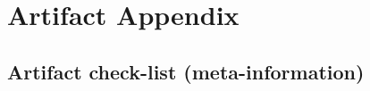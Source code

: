 %
%
%
%
%

\clearpage
\section{Artifact Appendix}


\subsection{Artifact check-list (meta-information)}

